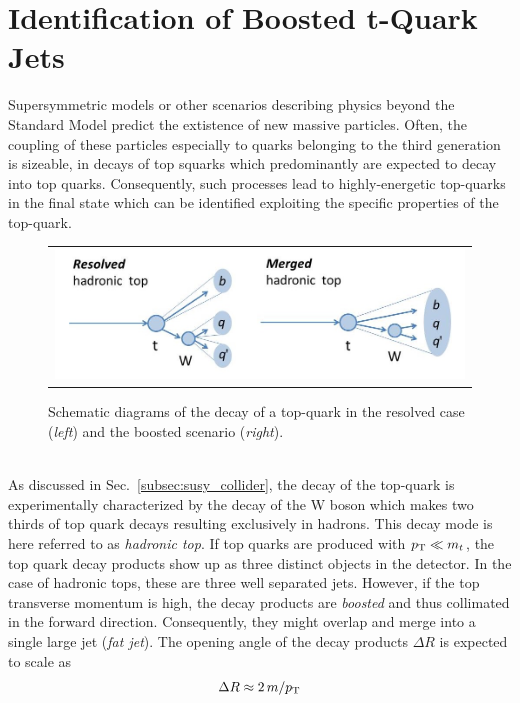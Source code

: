 \section{Identification of Boosted t-Quark Jets }
\label{sec:boosted_tops}
Supersymmetric models or other scenarios describing physics beyond the Standard Model predict the extistence of new massive particles. Often, the coupling of these particles especially to quarks belonging to the third generation is sizeable, \eg in decays of top squarks which predominantly are expected to decay into top quarks. Consequently, such processes lead to highly-energetic top-quarks in the final state which can be identified exploiting the specific properties of the top-quark. 
\begin{figure}[!tp]
  \centering 
  \begin{tabular}{c}
    \includegraphics[width=1.0\textwidth]{figures/BoostedTops.jpg} 
  \end{tabular}
  \caption{Schematic diagrams of the decay of a top-quark in the resolved case (\textit{left}) and the boosted scenario (\textit{right}).}
  \label{fig:boosted_top}
\end{figure}
\\
As discussed in Sec.~\ref{subsec:susy_collider}, the decay of the top-quark is experimentally characterized by the decay of the W boson which makes two thirds of top quark decays resulting exclusively in hadrons. This decay mode is here referred to as \textit{hadronic top}. If top quarks are produced with $p_{\text{T}} \ll m_t$, the top quark decay products show up as three distinct objects in the detector. In the case of hadronic tops, these are three well separated jets. However, if the top transverse momentum is high, the decay products are \textit{boosted} and thus collimated in the forward direction. Consequently, they might overlap and merge into a single large jet (\textit{fat jet}). The opening angle of the decay products $\Delta R$ is expected to scale as
\begin{equation}
 \Delta R \approx 2\,m /p_{\text{T}}
 \label{eq:rule-of-thumb}
\end{equation}  
